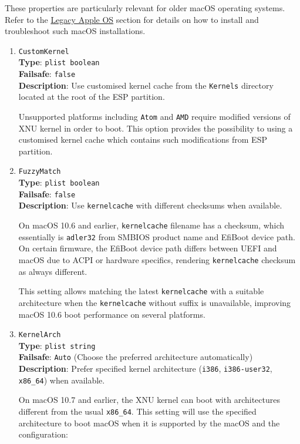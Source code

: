 \documentclass[]{article}
\begin{document}
These properties are particularly relevant for older macOS operating systems.
Refer to the \hyperref[legacyapple]{Legacy Apple OS} section for details on how
to install and troubleshoot such macOS installations.

\begin{enumerate}
\item
  \texttt{CustomKernel}\\
  \textbf{Type}: \texttt{plist\ boolean}\\
  \textbf{Failsafe}: \texttt{false}\\
  \textbf{Description}: Use customised kernel cache from the \texttt{Kernels}
  directory located at the root of the ESP partition.

  Unsupported platforms including \texttt{Atom} and \texttt{AMD} require modified versions
  of XNU kernel in order to boot. This option provides the possibility to using a customised
  kernel cache which contains such modifications from ESP partition.

\item
  \texttt{FuzzyMatch}\\
  \textbf{Type}: \texttt{plist\ boolean}\\
  \textbf{Failsafe}: \texttt{false}\\
  \textbf{Description}: Use \texttt{kernelcache} with different checksums when available.

  On macOS 10.6 and earlier, \texttt{kernelcache} filename has a checksum, which essentially
  is \texttt{adler32} from SMBIOS product name and EfiBoot device path. On certain firmware,
  the EfiBoot device path differs between UEFI and macOS due to ACPI or hardware specifics,
  rendering \texttt{kernelcache} checksum as always different.

  This setting allows matching the latest \texttt{kernelcache} with a suitable architecture
  when the \texttt{kernelcache} without suffix is unavailable, improving macOS 10.6 boot
  performance on several platforms.

\item
  \texttt{KernelArch}\\
  \textbf{Type}: \texttt{plist\ string}\\
  \textbf{Failsafe}: \texttt{Auto} (Choose the preferred architecture automatically)\\
  \textbf{Description}: Prefer specified kernel architecture (\texttt{i386},
  \texttt{i386-user32}, \texttt{x86\_64}) when available.

  On macOS 10.7 and earlier, the XNU kernel can boot with architectures different from
  the usual \texttt{x86\_64}. This setting will use the specified architecture to boot
  macOS when it is supported by the macOS and the configuration:


\end{enumerate}
\end{document}
